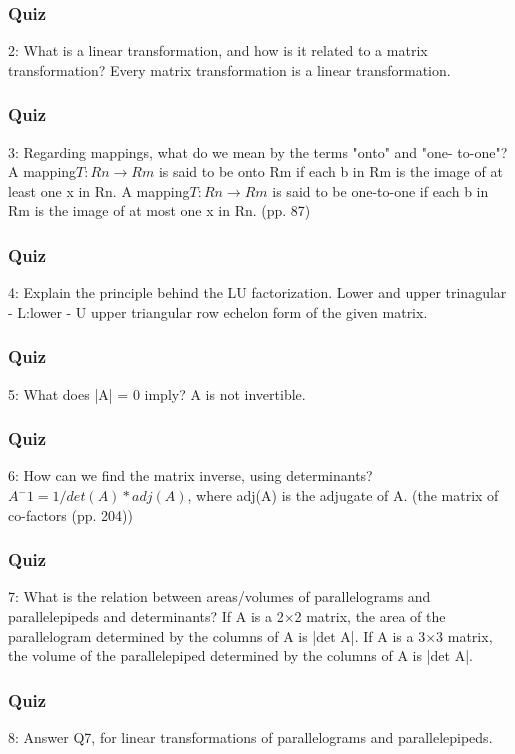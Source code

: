\subsubsection{Quiz} 2: What is a linear transformation, and how is it related to a matrix transformation?
        Every matrix transformation is a linear transformation.

\subsubsection{Quiz} 3: Regarding mappings, what do we mean by the terms "onto" and "one- to-one"?
        A mapping$ T : Rn \rightarrow Rm $ is said to be onto Rm if each b in Rm is the image of at least one x in Rn. 
        A mapping$ T : Rn \rightarrow Rm $ is said to be one-to-one if each b in Rm is the image of at most one x in Rn.
        (pp. 87)

\subsubsection{Quiz} 4: Explain the principle behind the LU factorization.
        Lower and upper trinagular - L:lower - U upper triangular row echelon form of the given matrix.

\subsubsection{Quiz} 5: What does |A| = 0 imply?
        A is not invertible.

\subsubsection{Quiz} 6: How can we find the matrix inverse, using determinants?
        $A^-1 = 1/det(A)*adj(A)$, where adj(A) is the adjugate of A. (the matrix of co-factors (pp. 204))

\subsubsection{Quiz} 7: What is the relation between areas/volumes of parallelograms and parallelepipeds and determinants?
        If A is a 2×2 matrix, the area of the parallelogram determined by the columns of A is |det A|. 
        If A is a 3×3 matrix, the volume of the parallelepiped determined by the columns of A is |det A|.

\subsubsection{Quiz} 8: Answer Q7, for linear transformations of parallelograms and parallelepipeds.

